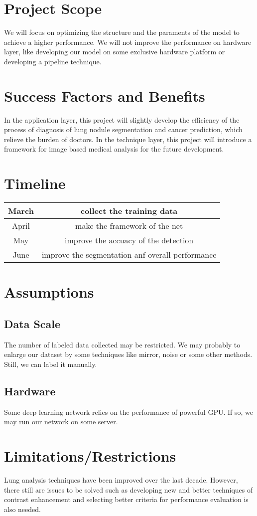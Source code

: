 \documentclass[hyperref]{article}
\theoremstyle{nonumberplain}
\begin{document}
\section{Project Scope}
We will focus on optimizing the structure and the paraments of the model to achieve a higher performance. We will not improve the performance on hardware layer, like developing our model on some exclusive hardware platform or developing a pipeline technique.
\section{Success Factors and Benefits}
In the application layer, this project will slightly develop the efficiency of the process of diagnosis of lung nodule segmentation and cancer prediction, which relieve the burden of doctors. In the technique layer, this project will introduce a framework for image based medical analysis for the future development.
\section{Timeline}
\begin{tabular}{c|c}
March & collect the training data\\
\hline
April & make the framework of the net\\
\hline
May   & improve the accuacy of the detection\\
\hline
June  & improve the segmentation anf overall performance\\
\end{tabular}
\section{Assumptions}
\subsection{Data Scale}
The number of labeled data collected may be restricted. We may probably to enlarge our dataset by some techniques like mirror, noise or some other methods. Still, we can label it manually.
\subsection{Hardware}
Some deep learning network relies on the performance of powerful GPU. If so, we may run our network on some server.
\section{Limitations/Restrictions}
Lung analysis techniques have been improved over the last decade. However, there still are issues to be solved such as developing new and better techniques of contrast enhancement and selecting better criteria for performance evaluation is also needed. 
\end{document}
